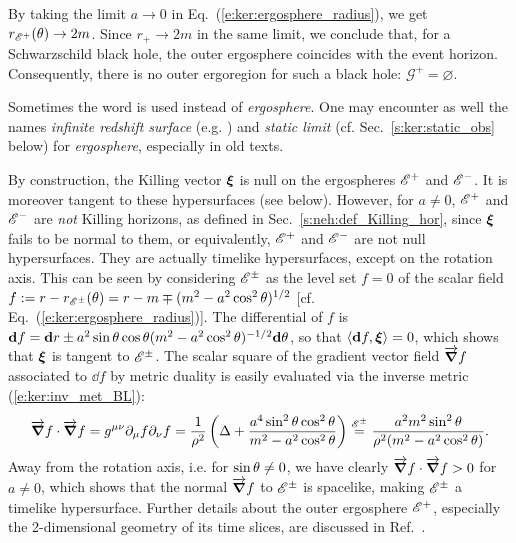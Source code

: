 \begin{remark}  \label{r:ker:no_outer_ergo_a_zero}
By taking the limit $a \to 0$ in Eq.~(\ref{e:ker:ergosphere_radius}),
we get $r_{\mathscr{E}^+}(\theta)\to 2m$. Since $r_+ \to 2m$ in the same limit,
we conclude that, for a Schwarzschild black hole, the outer ergosphere coincides
with the event horizon. Consequently, there is no outer ergoregion for such
a black hole: $\mathscr{G}^+ = \varnothing$.
\end{remark}

\begin{remark}  \label{r:ker:static_limit}
Sometimes the word  is used instead of
\emph{ergosphere}. One may encounter as well the names
\emph{infinite redshift surface} (e.g. \cite{Vishv68}) and
\emph{static limit} (cf. Sec.~\ref{s:ker:static_obs} below)
for \emph{ergosphere}, especially in old texts.
\end{remark}

\begin{remark}
By construction, the Killing vector $\bm{\xi}$ is null on the
ergospheres $\mathscr{E}^+$ and $\mathscr{E}^-$. It is moreover tangent to these
hypersurfaces (see below). However, for $a\neq 0$,
$\mathscr{E}^+$ and $\mathscr{E}^-$ are \emph{not} Killing horizons, as defined
in Sec.~\ref{s:neh:def_Killing_hor}, since
$\bm{\xi}$ fails to be normal to them, or equivalently, $\mathscr{E}^+$ and $\mathscr{E}^-$
are not null hypersurfaces. They are actually timelike hypersurfaces,
except on the rotation axis.
This can be seen by considering $\mathscr{E}^\pm$ as the level
set $f = 0$ of the scalar field
$f := r - r_{\mathscr{E}^\pm}(\theta) = r - m \mp (m^2 - a^2\cos^2\theta)^{1/2}$
[cf. Eq.~(\ref{e:ker:ergosphere_radius})].
The differential of $f$ is $\mathbf{d} f = \mathbf{d} r \pm a^2 \sin\theta \cos\theta
(m^2 - a^2\cos^2\theta)^{-1/2} \mathbf{d}\theta$, so that $\langle\mathbf{d} f, \bm{\xi} \rangle = 0$,
which shows that $\bm{\xi}$ is tangent to $\mathscr{E}^\pm$.
The scalar square of the gradient vector field
$\overrightarrow{\bm{\nabla}} f$ associated to $\dd f$ by metric duality
is easily evaluated via the inverse metric (\ref{e:ker:inv_met_BL}):
\[
    \overrightarrow{\bm{\nabla}} f\cdot \overrightarrow{\bm{\nabla}} f = g^{\mu\nu} \partial_\mu f \partial_\nu f
    = \frac{1}{\rho^2} \left( \Delta + \frac{a^4  \sin^2\theta\cos^2\theta}{m^2 - a^2\cos^2\theta} \right)
    \stackrel{\mathscr{E}^{\pm}}{=} \frac{a^2 m^2 \sin^2\theta}{\rho^2(m^2 - a^2\cos^2\theta)} .
\]
Away from the rotation axis, i.e. for $\sin\theta\neq 0$, we have clearly
$\overrightarrow{\bm{\nabla}} f\cdot \overrightarrow{\bm{\nabla}} f > 0$ for $a\neq 0$, which shows that the normal
$\overrightarrow{\bm{\nabla}} f$ to $\mathscr{E}^{\pm}$ is spacelike, making $\mathscr{E}^{\pm}$ a timelike
hypersurface. Further details about the outer ergosphere $\mathscr{E}^+$, especially
the 2-dimensional geometry of its time slices, are discussed in Ref.~\cite{JacobS09}.
\end{remark}

